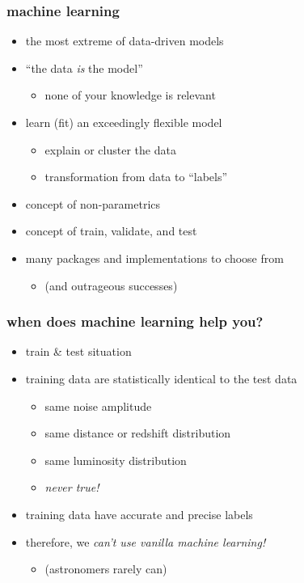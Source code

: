 \documentclass[pdftex]{beamer}
\begin{document}
\begin{frame}
  \frametitle{machine learning}
  \begin{itemize}
  \item the most extreme of data-driven models
  \item ``the data \emph{is} the model''
    \begin{itemize}
    \item none of your knowledge is relevant
    \end{itemize}
  \item learn (fit) an exceedingly flexible model
    \begin{itemize}
    \item explain or cluster the data
    \item transformation from data to ``labels''
    \end{itemize}
  \item concept of non-parametrics
  \item concept of train, validate, and test
  \item many packages and implementations to choose from
    \begin{itemize}
    \item (and outrageous successes)
    \end{itemize}
  \end{itemize}
\end{frame}

\begin{frame}
  \frametitle{when does machine learning help you?}
  \begin{itemize}
  \item train \& test situation
  \item training data are statistically identical to the test data
    \begin{itemize}
    \item same noise amplitude
    \item same distance or redshift distribution
    \item same luminosity distribution
    \item \emph{never true!}
    \end{itemize}
  \item training data have accurate and precise labels
  \item therefore, we \emph{can't use vanilla machine learning!}
    \begin{itemize}
    \item (astronomers rarely can)
    \end{itemize}
  \end{itemize}
\end{frame}
\end{document}
